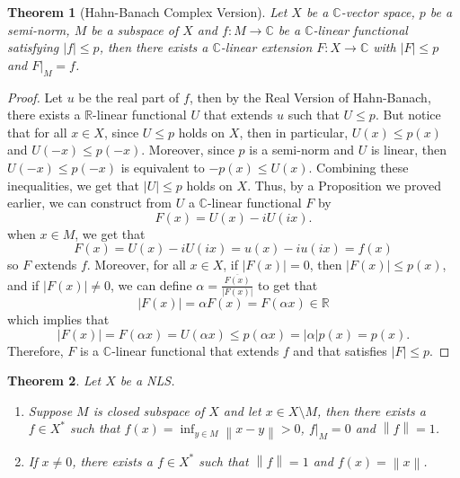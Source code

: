 \documentclass{article}
\newtheorem*{theorem}{Theorem}
\newcommand{\C}{\mathbb{C}}
\newcommand{\R}{\mathbb{R}}
\newcommand{\norm}[1]{\left\lVert#1 \right\rVert}
\begin{document}
\begin{theorem}[Hahn-Banach Complex Version]
    Let $X$ be a $\C$-vector space, $p$ be a semi-norm, $M$ be a subspace of $X$ and $f : M \to \C$ be a $\C$-linear functional satisfying $|f| \leq p$, then there exists a $\C$-linear extension $F : X \to \C$ with $|F| \leq p$ and $F|_M = f$.
\end{theorem}

\begin{proof}
    Let $u$ be the real part of $f$, then by the Real Version of Hahn-Banach, there exists a $\R$-linear functional $U$ that extends $u$ such that $U \leq p$. But notice that for all $x \in X$, since $U \leq p$ holds on $X$, then in particular, $U(x) \leq p(x)$ and $U(-x) \leq p(-x)$. Moreover, since $p$ is a semi-norm and $U$ is linear, then $U(-x) \leq p(-x)$ is equivalent to $-p(x) \leq U(x)$. Combining these inequalities, we get that $|U| \leq p$ holds on $X$. Thus, by a Proposition we proved earlier, we can construct from $U$ a $\C$-linear functional $F$ by
    $$F(x) = U(x) - iU(ix).$$
    when $x \in M$, we get that
    $$F(x) = U(x) - iU(ix) = u(x) - iu(ix) = f(x)$$
    so $F$ extends $f$. Moreover, for all $x \in X$, if $|F(x)| = 0$, then $|F(x)| \leq p(x)$, and if $|F(x)| \neq 0$, we can define $\alpha = \frac{\overline{F(x)}}{|F(x)|}$ to get that 
    $$|F(x)| = \alpha F(x) = F(\alpha x) \in \R$$
    which implies that
    $$|F(x)| = F(\alpha x) = U(\alpha x) \leq p(\alpha x) = |\alpha| p(x) = p(x).$$
    Therefore, $F$ is a $\C$-linear functional that extends $f$ and that satisfies $|F| \leq p$.
\end{proof}

\begin{theorem}
    Let $X$ be a NLS.
    \begin{enumerate}[label=(\alph*)]
        \item Suppose $M$ is closed subspace of $X$ and let $x \in X \setminus M$, then there exists a $f \in X^*$ such that $f(x) = \inf_{y\in M}\norm{x - y} > 0$, $f|_M = 0$ and $\norm{f} = 1$.
        \item If $x \neq 0$, there exists a $f \in X^*$ such that $\norm{f} = 1$ and $f(x) = \norm{x}$.
    \end{enumerate}
\end{theorem}
\end{document}
